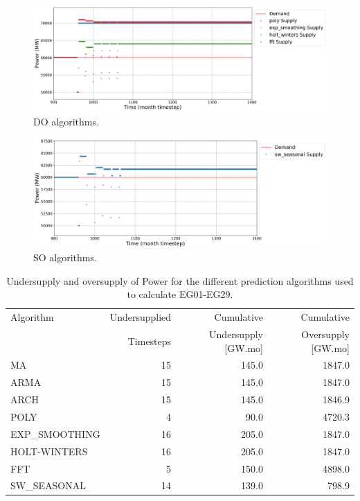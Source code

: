 \documentclass[11pt]{article}
\begin{document}
\begin{figure}[H]
	\centering
	\includegraphics[width=\textwidth]{29-figures/29-power0-buffer02.png} 
	\hfill
	\caption{DO algorithms.}
	\label{fig:29-DO}
\end{figure}

\begin{figure}[H]
	\centering
	\includegraphics[width=\textwidth]{29-figures/29-power0-buffer03.png} 
	\hfill
	\caption{SO algorithms.}
	\label{fig:29-SO}
\end{figure}

\begin{table}[H]
	\centering
	\caption{Undersupply and oversupply of Power for the different prediction algorithms used to calculate EG01-EG29.}
	\label{tab:29-power}
	\begin{tabularx}{\textwidth}{lRRR}
		\hline
		Algorithm & Undersupplied & Cumulative  & Cumulative \\
		& Timesteps     & Undersupply [GW.mo]  & Oversupply [GW.mo] \\ \hline
		MA        & 15 	& 145.0 & 1847.0 \\ 
		ARMA      & 15 	& 145.0 & 1847.0 \\ 
		ARCH      & 15 	& 145.0 & 1846.9 \\ 
		POLY      &  4 	& 90.0 & 4720.3 \\ 
		EXP\_SMOOTHING 	& 16 & 205.0 & 1847.0 \\ 
		HOLT-WINTERS  	& 16 & 205.0 & 1847.0 \\ 
		FFT       &  5	& 150.0	& 4898.0 \\ 
		SW\_SEASONAL    & 14 & 139.0 & 798.9 \\ \hline
	\end{tabularx}
\end{table}
\end{document}
